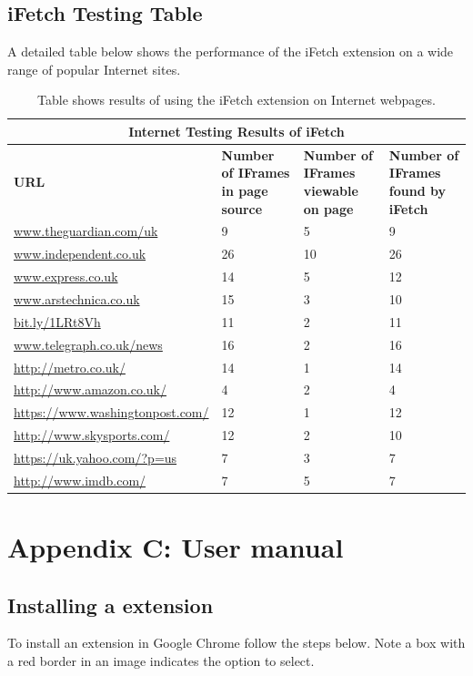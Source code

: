 \documentclass[12pt]{article}
\begin{document}
\subsection{iFetch Testing Table} \label{iFetchTesting}
A detailed table below shows the performance of the iFetch extension on a wide range of popular Internet sites. 

{
\begin{table} [H]
\centering
\begin{tabular}{ |p{4cm}|p{3cm}|p{3cm}| p{3cm} | }
\hline
\multicolumn{4}{|c|}{\textbf{Internet Testing Results of iFetch}} \\
\hline
\textbf{URL} & \textbf{Number of IFrames in page source} & \textbf{Number of IFrames viewable on page} & \textbf{Number of IFrames found by iFetch} \\
\hline
\url{www.theguardian.com/uk} & 9 & 5 & 9 \\
\hline
\url{www.independent.co.uk} & 26 & 10 & 26 \\
\hline
\url{www.express.co.uk} & 14 & 5 & 12 \\
\hline
\url{www.arstechnica.co.uk} & 15 & 3 & 10  \\
\hline
\url{bit.ly/1LRt8Vh} & 11 & 2 & 11 \\
\hline
\url{www.telegraph.co.uk/news} & 16 & 2 & 16\\
\hline
\url{http://metro.co.uk/} & 14 & 1 & 14 \\
\hline
\url{http://www.amazon.co.uk/} & 4 & 2 & 4 \\
\hline
\url{https://www.washingtonpost.com/} & 12 & 1 & 12 \\
\hline
\url{http://www.skysports.com/} & 12 & 2 & 10\\
\hline
\url{https://uk.yahoo.com/?p=us} & 7 & 3 & 7 \\
\hline
\url{http://www.imdb.com/} & 7 & 5 & 7 \\
\hline
\end{tabular}
\caption{Table shows results of using the iFetch extension on Internet webpages.}
\label{table:5}
\end{table}
}

\section{Appendix C: User manual} \label{userman}

\subsection{Installing a extension} \label{installPlugin}
To install an extension in Google Chrome follow the steps below. Note a box with a red border in an image indicates the option to select. 
\end{document}
